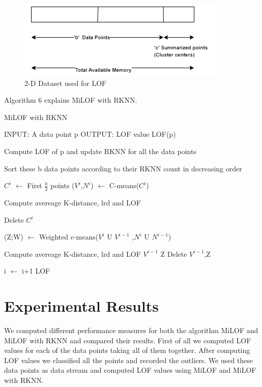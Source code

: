 \begin{figure}[H]
	\centering
	\includegraphics{chap04/partition.png}
	\caption{2-D Dataset used for LOF}
\end{figure}




Algorithm 6 explains MiLOF with RKNN. 

\begin{algorithm}[H]
	\caption{MiLOF with RKNN}
	\begin{algorithmic}
		\STATE  
		\STATE INPUT:  A data point p 
		\STATE OUTPUT: LOF value LOF(p)
		\STATE
		
		\STATE Compute LOF of p and update RKNN for all the data points 
		
		\STATE Sort these b data points according to their RKNN count in decreasing order
		
		\STATE $C^i$ $\leftarrow$ First $\frac{b}{2}$ points
		\STATE ($V^i$,$N^i$) $\leftarrow$ C-means($C^i$)
		
		\STATE Compute avereage K-distance, lrd and LOF
		\ENDFOR
		
		\STATE Delete $C^i$
		
		\STATE (Z;W) $\leftarrow$ Weighted c-means($V^i$ U $V^{i-1}$ ,$N^i$ U $N^{i-1}$)
		
		\STATE Compute avereage K-distance, lrd and LOF
		\ENDFOR 
		\STATE $V^{i-1}$ \leftarrow Z
		\STATE Delete $V^{i-1}$,Z
		
		\ENDIF	
		\ENDIF
		
		\STATE i $\leftarrow$ i+1
		\RETURN LOF
	\end{algorithmic}
\end{algorithm}



\section{Experimental Results}
We computed different performance measures for both the algorithm MiLOF and MiLOF with RKNN and compared their results.
 First of all we computed LOF values for each of the data points taking all of them together. After computing LOF values we classified all the points and recorded the outliers. We used these data points as data stream and computed LOF values using MiLOF and MiLOF with RKNN.  

